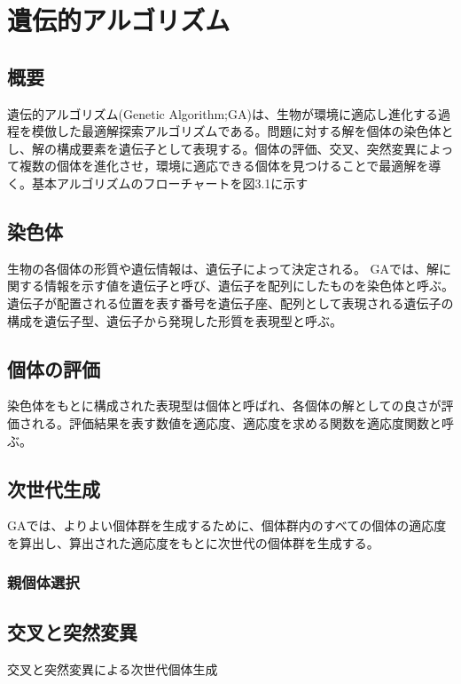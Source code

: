 \chapter{遺伝的アルゴリズム}

\section{概要}
遺伝的アルゴリズム(Genetic Algorithm;GA)は、生物が環境に適応し進化する過程を模倣した最適解探索アルゴリズムである。問題に対する解を個体の染色体とし、解の構成要素を遺伝子として表現する。個体の評価、交叉、突然変異によって複数の個体を進化させ，環境に適応できる個体を見つけることで最適解を導く。基本アルゴリズムのフローチャートを図3.1に示す

\section{染色体}
生物の各個体の形質や遺伝情報は、遺伝子によって決定される。
GAでは、解に関する情報を示す値を遺伝子と呼び、遺伝子を配列にしたものを染色体と呼ぶ。
遺伝子が配置される位置を表す番号を遺伝子座、配列として表現される遺伝子の構成を遺伝子型、遺伝子から発現した形質を表現型と呼ぶ。

\section{個体の評価}
染色体をもとに構成された表現型は個体と呼ばれ、各個体の解としての良さが評価される。評価結果を表す数値を適応度、適応度を求める関数を適応度関数と呼ぶ。

\section{次世代生成}
GAでは、よりよい個体群を生成するために、個体群内のすべての個体の適応度を算出し、算出された適応度をもとに次世代の個体群を生成する。

\subsection{親個体選択}

\section{交叉と突然変異}
交叉と突然変異による次世代個体生成

